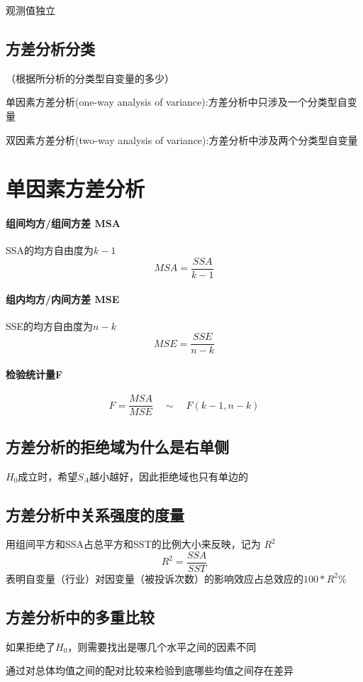 \documentclass[UTF8,10pt]{book}
\begin{document}
观测值独立

\subsection{方差分析分类}
 （根据所分析的分类型自变量的多少）	
 
 单因素方差分析(one-way analysis of variance):方差分析中只涉及一个分类型自变量 
 
 双因素方差分析(two-way analysis of variance):方差分析中涉及两个分类型自变量

\section{单因素方差分析}

\paragraph{组间均方/组间方差 MSA}
    SSA的均方自由度为$k-1$ 
    $$ MSA = \frac{SSA}{k-1} $$

\paragraph{组内均方/内间方差 MSE}	
    SSE的均方自由度为$n-k$ 
    $$ MSE = \frac{SSE}{n-k} $$

\paragraph{检验统计量F}	
$$ F = \frac{MSA}{MSE} \quad \sim \quad F(k-1,n-k) $$

\subsection{方差分析的拒绝域为什么是右单侧}
	$H_0$成立时，希望$S_A$越小越好，因此拒绝域也只有单边的
\subsection{方差分析中关系强度的度量}	
用组间平方和SSA占总平方和SST的比例大小来反映，记为
$R^2$ 
$$ R^2 = \frac{SSA}{SST} $$ 
表明自变量（行业）对因变量（被投诉次数）的影响效应占总效应的$100*R^2\%$
\subsection{方差分析中的多重比较}	
如果拒绝了$H_0$，则需要找出是哪几个水平之间的因素不同 

通过对总体均值之间的配对比较来检验到底哪些均值之间存在差异 
\end{document}
